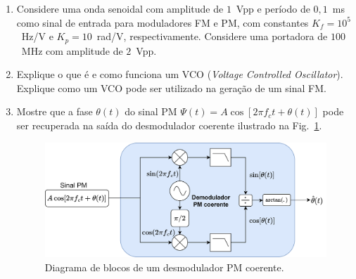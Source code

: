 \documentclass[12pt,addpoints]{exam}
\begin{document}
\begin{enumerate}
    \item Considere uma onda senoidal com amplitude de $1$~Vpp e período de $0,1$~ms como sinal de entrada para moduladores FM e PM, com constantes $K_f = 10^5$~Hz/V e $K_{p} = 10$~rad/V, respectivamente. Considere uma portadora de $100$~MHz com amplitude de $2$~Vpp.
    \item Explique o que é e como funciona um VCO (\textit{Voltage Controlled Oscillator}). Explique como um VCO pode ser utilizado na geração de um sinal FM.    
    
    \item Mostre que a fase $\theta(t)$ do sinal PM $\varPsi(t) = A\cos[2\pi f_c t + \theta(t)]$ pode ser recuperada na saída do desmodulador coerente ilustrado na Fig.~\ref{fig:GRC_4-0}.
    
    \begin{figure}[h]
        \centering
        \includegraphics[width=0.85\linewidth]{./Figuras/PM-Demod.png}
        \caption{Diagrama de blocos de um desmodulador PM coerente.} 
        \label{fig:GRC_4-0}
    \end{figure}
  
  \end{enumerate}
  
\end{document}
